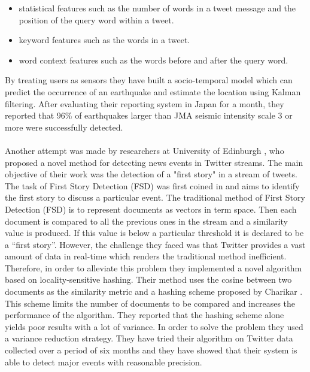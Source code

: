 \begin{itemize}
  \item statistical features such as the number of words in a tweet message and the position of the query word within a tweet.\vspace{2pt}
  \item keyword features such as the words in a tweet.\vspace{2pt}
  \item word context features such as the words before and after the query word. 
\end{itemize}\vspace{15pt}
By treating users as sensors they have built a socio-temporal model which can predict the occurrence of an earthquake and estimate the location using Kalman filtering. After evaluating their reporting system in Japan for a month, they reported that 96\% of earthquakes larger than JMA seismic intensity scale 3 or more were successfully detected.\\\\
Another attempt was made by researchers at University of Edinburgh \citep{Petrovic10streamingfirst}, who proposed a novel method for detecting news events in Twitter streams. The main objective of their work was the detection of a "first story" in a stream of tweets. The task of First Story Detection (FSD) was first coined in \citep{Allan:2002:TDT:772260} and aims to identify the first story to discuss a particular event. The traditional method of First Story Detection (FSD) is to represent documents as vectors in term space. Then each document is compared to all the previous ones in the stream and a similarity value is produced. If this value is below a particular threshold it is declared to be a ``first story''. However, the challenge they faced was that Twitter provides a vast amount of data in real-time which renders the traditional method inefficient. Therefore, in order to alleviate this problem they implemented a novel algorithm based on locality-sensitive hashing. Their method uses the cosine between two documents as the similarity metric and a hashing scheme proposed by Charikar \citep{Charikar02similarityestimation}. This scheme limits the number of documents to be compared and increases the performance of the algorithm. They reported that the hashing scheme alone yields poor results with a lot of variance. In order to solve the problem they used a variance reduction strategy. They have tried their algorithm on Twitter data collected over a period of six months and they have showed that their system is able to detect major events with reasonable precision. \\\\
